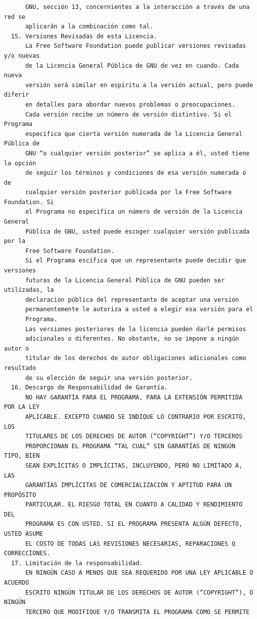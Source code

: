 \begin{verbatim}
      GNU, sección 13, concernientes a la interacción a través de una red se
      aplicarán a la combinación como tal.
  15. Versiones Revisadas de esta Licencia.
      La Free Software Foundation puede publicar versiones revisadas y/o nuevas
      de la Licencia General Pública de GNU de vez en cuando. Cada nueva
      versión será similar en espíritu a la versión actual, pero puede diferir
      en detalles para abordar nuevos problemas o preocupaciones.
      Cada versión recibe un número de versión distintivo. Si el Programa
      especifica que cierta versión numerada de la Licencia General Pública de
      GNU “o cualquier versión posterior” se aplica a él, usted tiene la opción
      de seguir los términos y condiciones de esa versión numerada o de
      cualquier versión posterior publicada por la Free Software Foundation. Si
      el Programa no especifica un número de versión de la Licencia General
      Pública de GNU, usted puede escoger cualquier versión publicada por la
      Free Software Foundation.
      Si el Programa escifica que un representante puede decidir que versiones
      futuras de la Licencia General Pública de GNU pueden ser utilizadas, la
      declaración pública del representante de aceptar una versión
      permanentemente le autoriza a usted a elegir esa versión para el
      Programa.
      Las versiones posteriores de la licencia pueden darle permisos
      adicionales o diferentes. No obstante, no se impone a ningún autor o
      titular de los derechos de autor obligaciones adicionales como resultado
      de su elección de seguir una versión posterior.
  16. Descargo de Responsabilidad de Garantía.
      NO HAY GARANTÍA PARA EL PROGRAMA, PARA LA EXTENSIÓN PERMITIDA POR LA LEY
      APLICABLE. EXCEPTO CUANDO SE INDIQUE LO CONTRARIO POR ESCRITO, LOS
      TITULARES DE LOS DERECHOS DE AUTOR (“COPYRIGHT”) Y/O TERCEROS
      PROPORCIONAN EL PROGRAMA “TAL CUAL” SIN GARANTÍAS DE NINGÚN TIPO, BIEN
      SEAN EXPLÍCITAS O IMPLÍCITAS, INCLUYENDO, PERO NO LIMITADO A, LAS
      GARANTÍAS IMPLÍCITAS DE COMERCIALIZACIÓN Y APTITUD PARA UN PROPÓSITO
      PARTICULAR. EL RIESGO TOTAL EN CUANTO A CALIDAD Y RENDIMIENTO DEL
      PROGRAMA ES CON USTED. SI EL PROGRAMA PRESENTA ALGÚN DEFECTO, USTED ASUME
      EL COSTO DE TODAS LAS REVISIONES NECESARIAS, REPARACIONES O CORRECCIONES.
  17. Limitación de la responsabilidad.
      EN NINGÚN CASO A MENOS QUE SEA REQUERIDO POR UNA LEY APLICABLE O ACUERDO
      ESCRITO NINGÚN TITULAR DE LOS DERECHOS DE AUTOR (“COPYRIGHT”), O NINGÚN
      TERCERO QUE MODIFIQUE Y/O TRANSMITA EL PROGRAMA COMO SE PERMITE

\end{verbatim}
